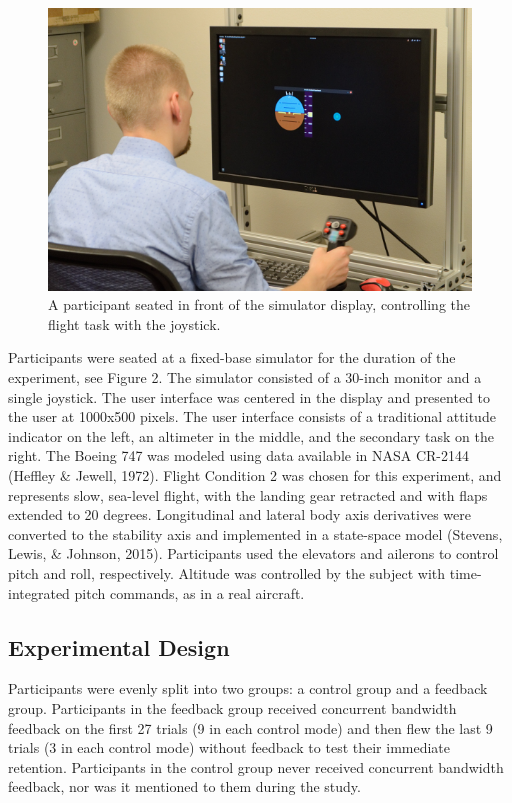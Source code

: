 \begin{figure}[b!]
    \begin{center}
        \includegraphics[width=0.8\linewidth]{figures/image2.png}
        \caption{A participant seated in front of the simulator display, controlling the flight task with the joystick.}
    \end{center}
\end{figure}

Participants were seated at a fixed-base simulator for the duration of the experiment, see Figure 2.
The simulator consisted of a 30-inch monitor and a single joystick.
The user interface was centered in the display and presented to the user at 1000x500 pixels.
The user interface consists of a traditional attitude indicator on the left, an altimeter in the middle, and the secondary task on the right.
The Boeing 747 was modeled using data available in NASA CR-2144 (Heffley \& Jewell, 1972).
Flight Condition 2 was chosen for this experiment, and represents slow, sea-level flight, with the landing gear retracted and with flaps extended to 20 degrees.
Longitudinal and lateral body axis derivatives were converted to the stability axis and implemented in a state-space model (Stevens, Lewis, \& Johnson, 2015).
Participants used the elevators and ailerons to control pitch and roll, respectively.
Altitude was controlled by the subject with time-integrated pitch commands, as in a real aircraft.

\subsection{Experimental Design}

Participants were evenly split into two groups: a control group and a feedback group.
Participants in the feedback group received concurrent bandwidth feedback on the first 27 trials (9 in each control mode) and then flew the last 9 trials (3 in each control mode) without feedback to test their immediate retention.
Participants in the control group never received concurrent bandwidth feedback, nor was it mentioned to them during the study.

